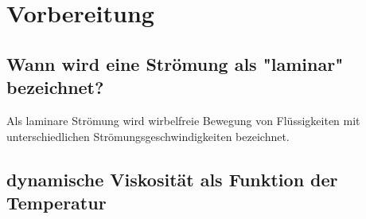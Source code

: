 \section{Vorbereitung}
\label{sec:Vorbereitung}

\subsection{Wann wird eine Strömung als "laminar" bezeichnet?}
    Als laminare Strömung  wird wirbelfreie Bewegung von Flüssigkeiten mit unterschiedlichen Strömungsgeschwindigkeiten bezeichnet.

\subsection{dynamische Viskosität als Funktion der Temperatur}
    